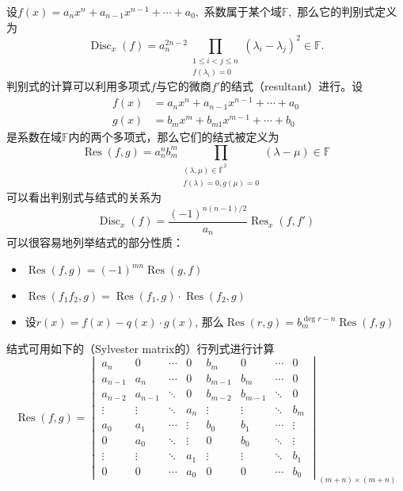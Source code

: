 设$f(x) = a_{n}x^{n} + a_{n-1}x^{n-1} + \cdots + a_{0},$ 系数属于某个域$\mathbb{F},$ 那么它的判别式定义为
$$\operatorname{Disc}_x(f) = a_n^{2n-2} \prod_{\substack{1 \leqslant i < j \leqslant n \\ f(\lambda_i) = 0}} (\lambda_i - \lambda_j)^2 \in \mathbb{F}.$$
判别式的计算可以利用多项式$f$与它的微商$f'$的结式（resultant）进行。设
\begin{align*}
f(x) & = a_{n}x^{n} + a_{n-1}x^{n-1} + \cdots + a_{0} \\
g(x) & = b_{m}x^{m} + b_{m1}x^{m-1} + \cdots + b_{0}
\end{align*}
是系数在域$\mathbb{F}$内的两个多项式，那么它们的结式被定义为
$$
\operatorname{Res} (f, g) = a_n^n b_m^m \prod_{ \substack{(\lambda, \mu) \in \bar{\mathbb{F}}^2 \\ f(\lambda) = 0, g(\mu) = 0}} (\lambda - \mu) \in \mathbb{F}
$$
可以看出判别式与结式的关系为
$$
\operatorname{Disc}_{x}(f) = \frac{(-1)^{n(n-1)/2}}{a_{n}} \operatorname{Res}_{x}(f, f')
$$
可以很容易地列举结式的部分性质：
\begin{itemize}
\item $\operatorname{Res} (f, g) = (-1)^{mn} \operatorname{Res} (g, f)$
\item $\operatorname{Res} (f_1f_2, g) = \operatorname{Res} (f_1, g) \cdot \operatorname{Res} (f_2, g)$
\item 设$r(x) = f(x) - q(x) \cdot g(x)$, 那么$\operatorname{Res} (r, g) = b_m^{\deg r - n}\operatorname{Res} (f, g)$
\end{itemize}
结式可用如下的（Sylvester matrix的）行列式进行计算
$$
\operatorname{Res} (f, g) = \begin{vmatrix} a_{n} & 0 & \cdots & 0 & b_{m} & 0 & \cdots & 0 \\ a_{n-1} & a_{n} & \cdots & 0 & b_{m-1} & b_{m} & \cdots & 0 \\ a_{n-2} & a_{n-1} & \ddots & 0 & b_{m-2} & b_{m-1} & \ddots & 0 \\ \vdots & \vdots & \ddots & a_{n} & \vdots & \vdots & \ddots & b_{m} \\ a_{0} & a_{1} & \cdots & \vdots & b_{0} & b_{1} & \cdots & \vdots \\ 0 & a_{0} & \ddots & \vdots & 0 & b_{0} & \ddots & \vdots \\ \vdots & \vdots & \ddots & a_{1} & \vdots & \vdots & \ddots & b_{1} \\ 0 & 0 & \cdots & a_{0} & 0 & 0 & \cdots & b_{0}\end{vmatrix}_{(m+n) \times (m+n)}
$$

